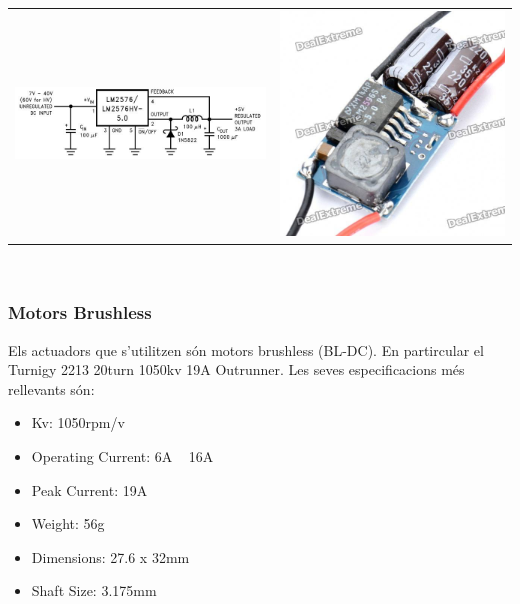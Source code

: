 \documentclass[twoside]{article}
\begin{document}
\begin{tabular}{m{10cm}m{6cm}}
\includegraphics[scale=0.55]{images/lm2576s.jpeg} &
\includegraphics[scale=0.12]{images/regulator.jpg}
\end{tabular}\\

\subsubsection*{Motors Brushless}
Els actuadors que s'utilitzen són motors brushless (BL-DC). En partircular el Turnigy 2213 20turn 1050kv 19A Outrunner. Les seves especificacions més rellevants són:
\begin{itemize}
\item Kv: 1050rpm/v
\item Operating Current: 6A ~ 16A
\item Peak Current: 19A
\item Weight: 56g
\item Dimensions: 27.6 x 32mm
\item Shaft Size: 3.175mm
\end{itemize}
\end{document}
